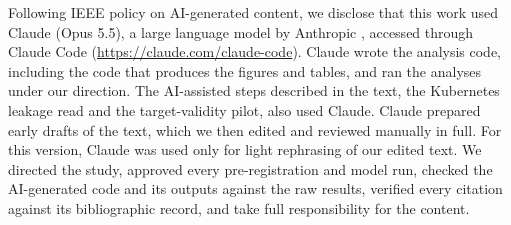 Following IEEE policy on AI-generated content, we disclose that this work
used Claude (Opus 5.5), a large language model by Anthropic
\cite{anthropic2026claude}, accessed through Claude Code
(\url{https://claude.com/claude-code}). Claude wrote the analysis code,
including the code that produces the figures and tables, and ran the
analyses under our direction. The AI-assisted steps described in the text,
the Kubernetes leakage read and the target-validity pilot, also used
Claude. Claude prepared early drafts of the text, which we then edited
and reviewed manually in full. For this version, Claude was used only for light
rephrasing of our edited text. We directed the study, approved every
pre-registration and model run, checked the AI-generated code and its
outputs against the raw results, verified every citation against its
bibliographic record, and take full responsibility for the content.
